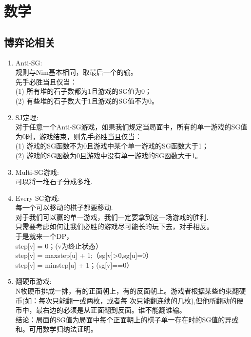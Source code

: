 \documentclass[landscape, twocolumn, 8pt, a4paper, twoside]{extarticle}
\begin{document}
\section{数学}
\subsection{博弈论相关}
\begin{enumerate}
	\item Anti-SG:\\
		规则与Nim基本相同，取最后一个的输。\\
		先手必胜当且仅当：\\
		(1) 所有堆的石子数都为1且游戏的SG值为0；\\
		(2) 有些堆的石子数大于1且游戏的SG值不为0。\\
	\item SJ定理:\\
		对于任意一个Anti-SG游戏，如果我们规定当局面中，所有的单一游戏的SG值为0时，游戏结束，则先手必胜当且仅当：\\
		(1) 游戏的SG函数不为0且游戏中某个单一游戏的SG函数大于1；\\
		(2) 游戏的SG函数为0且游戏中没有单一游戏的SG函数大于1。\\
	\item Multi-SG游戏:\\
		可以将一堆石子分成多堆.\\
	\item Every-SG游戏:\\
		每一个可以移动的棋子都要移动.\\
		对于我们可以赢的单一游戏，我们一定要拿到这一场游戏的胜利.\\
		只需要考虑如何让我们必胜的游戏尽可能长的玩下去，对手相反。\\
		于是就来一个DP，\\
		step[v] = 0；(v为终止状态）\\
		step[v] = max{step[u]} + 1;（sg[v]>0,sg[u]=0）\\
		step[v] = min{step[u]} + 1；(sg[v]==0）\\
	\item 翻硬币游戏:\\
		N枚硬币排成一排，有的正面朝上，有的反面朝上。游戏者根据某些约束翻硬币(如：每次只能翻一或两枚，或者每 次只能翻连续的几枚),但他所翻动的硬币中，最右边的必须是从正面翻到反面。谁不能翻谁输。\\
		结论：局面的SG值为局面中每个正面朝上的棋子单一存在时的SG值的异或和。可用数学归纳法证明。\\

\end{enumerate}
\end{document}
